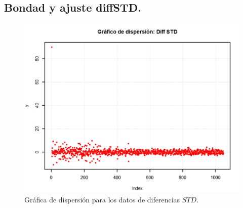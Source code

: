 \documentclass[10.5pt,notitlepage]{article}
\newcommand{\kis}[1]{\left\{ #1 \right\}}
\newcommand{\floor}[1]{\lfloor #1 \rfloor}
\theoremstyle{plain}
\begin{document}

\subsection{Bondad y ajuste diffSTD.}

\begin{figure}[htb]
    \centering
    \includegraphics[scale = 0.4]{incisoc/DSDisp.png}
    \caption{Gráfica de dispersión para los datos de diferencias \(STD\).}
    \label{fig:21}
\end{figure}
\end{document}
